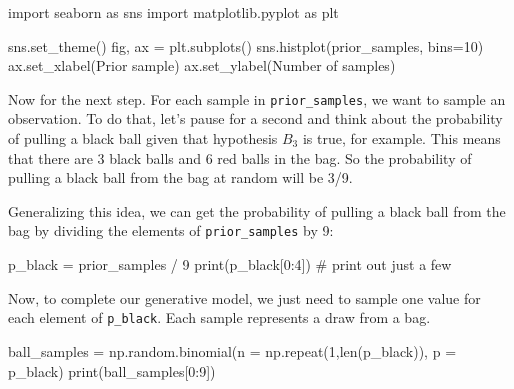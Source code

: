 \documentclass[
  letterpaper,
  DIV=11,
  numbers=noendperiod]{scrreprt}
\newenvironment{Shaded}{\begin{snugshade}}{\end{snugshade}}
\newcommand{\BuiltInTok}[1]{\textcolor[rgb]{0.00,0.23,0.31}{#1}}
\newcommand{\CommentTok}[1]{\textcolor[rgb]{0.37,0.37,0.37}{#1}}
\newcommand{\DecValTok}[1]{\textcolor[rgb]{0.68,0.00,0.00}{#1}}
\newcommand{\ImportTok}[1]{\textcolor[rgb]{0.00,0.46,0.62}{#1}}
\newcommand{\NormalTok}[1]{\textcolor[rgb]{0.00,0.23,0.31}{#1}}
\newcommand{\OperatorTok}[1]{\textcolor[rgb]{0.37,0.37,0.37}{#1}}
\newcommand{\StringTok}[1]{\textcolor[rgb]{0.13,0.47,0.30}{#1}}
\begin{document}
\begin{Shaded}
\begin{Highlighting}[]
\ImportTok{import}\NormalTok{ seaborn }\ImportTok{as}\NormalTok{ sns}
\ImportTok{import}\NormalTok{ matplotlib.pyplot }\ImportTok{as}\NormalTok{ plt}

\NormalTok{sns.set\_theme()}
\NormalTok{fig, ax }\OperatorTok{=}\NormalTok{ plt.subplots()}
\NormalTok{sns.histplot(prior\_samples, bins}\OperatorTok{=}\DecValTok{10}\NormalTok{)}
\NormalTok{ax.set\_xlabel(}\StringTok{\textquotesingle{}Prior sample\textquotesingle{}}\NormalTok{)}
\NormalTok{ax.set\_ylabel(}\StringTok{\textquotesingle{}Number of samples\textquotesingle{}}\NormalTok{)}
\end{Highlighting}
\end{Shaded}

Now for the next step. For each sample in \texttt{prior\_samples}, we
want to sample an observation. To do that, let's pause for a second and
think about the probability of pulling a black ball given that
hypothesis \(B_3\) is true, for example. This means that there are 3
black balls and 6 red balls in the bag. So the probability of pulling a
black ball from the bag at random will be 3/9.

Generalizing this idea, we can get the probability of pulling a black
ball from the bag by dividing the elements of \texttt{prior\_samples} by
9:

\begin{Shaded}
\begin{Highlighting}[]
\NormalTok{p\_black }\OperatorTok{=}\NormalTok{ prior\_samples }\OperatorTok{/} \DecValTok{9}
\BuiltInTok{print}\NormalTok{(p\_black[}\DecValTok{0}\NormalTok{:}\DecValTok{4}\NormalTok{]) }\CommentTok{\# print out just a few}
\end{Highlighting}
\end{Shaded}

Now, to complete our generative model, we just need to sample one value
for each element of \texttt{p\_black}. Each sample represents a draw
from a bag.

\begin{Shaded}
\begin{Highlighting}[]
\NormalTok{ball\_samples }\OperatorTok{=}\NormalTok{ np.random.binomial(n }\OperatorTok{=}\NormalTok{ np.repeat(}\DecValTok{1}\NormalTok{,}\BuiltInTok{len}\NormalTok{(p\_black)),}
\NormalTok{                                  p }\OperatorTok{=}\NormalTok{ p\_black)}
\BuiltInTok{print}\NormalTok{(ball\_samples[}\DecValTok{0}\NormalTok{:}\DecValTok{9}\NormalTok{])}
\end{Highlighting}
\end{Shaded}
\end{document}
